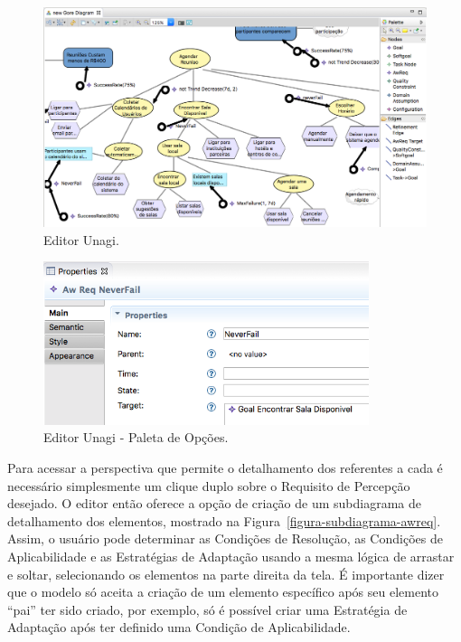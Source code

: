 \begin{figure}
	\centering
	\includegraphics[width=1\textwidth]{figuras/unagi/modeloemunagi.png}
	\caption{Editor Unagi.}
	\label{figura-paleta-unagi}
\end{figure}

\begin{figure}
	\centering
	\includegraphics[width=0.85\textwidth]{figuras/unagi/paletaopcoes.png}
	\caption{Editor Unagi - Paleta de Opções.}
	\label{unagi-paleta-opcoes}
\end{figure}

Para acessar a perspectiva que permite o detalhamento dos \evoreqs referentes a cada \awreq é necessário simplesmente um clique duplo sobre o Requisito de Percepção desejado. O editor então oferece a opção de criação de um subdiagrama de detalhamento dos elementos, mostrado na Figura~\ref{figura-subdiagrama-awreq}. Assim, o usuário pode determinar as Condições de Resolução, as Condições de Aplicabilidade e as Estratégias de Adaptação usando a mesma lógica de arrastar e soltar, selecionando os elementos na parte direita da tela. É importante dizer que o modelo só aceita a criação de um elemento específico após seu elemento ``pai'' ter sido criado, por exemplo, só é possível criar uma Estratégia de Adaptação após ter definido uma Condição de Aplicabilidade.

